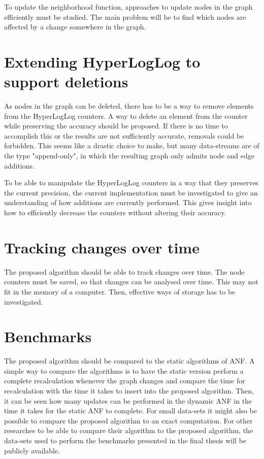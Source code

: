 To update the neighborhood function, approaches to update nodes in the graph efficiently must be studied. The main problem will be to find which nodes are affected by a change somewhere in the graph.


\section{Extending HyperLogLog to support deletions}
As nodes in the graph can be deleted, there has to be a way to remove elements from the HyperLogLog counters.  A way to delete an element from the counter while preserving the accuracy should be proposed. If there is no time to accomplish this or the results are not sufficiently accurate, removals could be forbidden. This seems like a drastic choice to make, but many data-streams are of the type "append-only", in which the resulting graph only admits node and edge additions.

To be able to manipulate the HyperLogLog counters in a way that they preserves the current precision, the current implementation must be investigated to give an understanding of how additions are currently performed. This gives insight into how to efficiently decrease the counters without altering their accuracy.


\section{Tracking changes over time}
The proposed algorithm should be able to track changes over time. The node counters must be saved, so that changes can be analysed over time. This may not fit in the memory of a computer. Then, effective ways of storage has to be investigated.


\section{Benchmarks} 
The proposed algorithm should be compared to the static algorithms of ANF.
A simple way to compare the algorithms is to have the static version perform a complete recalculation whenever the graph changes and compare the time for recalculation with the time it takes to insert into the proposed algorithm. Then,
it can be seen how many updates can be performed in the dynamic ANF in the time it takes for the static ANF to complete. For small data-sets it might also be possible to compare the proposed algorithm to an exact computation. For other researches to be able to compare their algorithm to the proposed algorithm, the data-sets used to perform the benchmarks presented in the final thesis will be publicly available.





